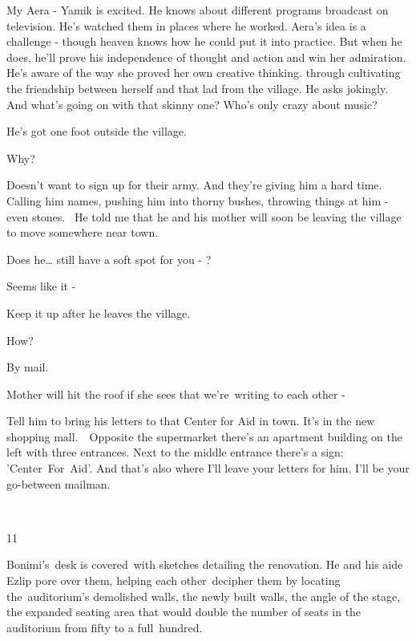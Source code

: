 \documentclass[twoside,11pt]{book}
\begin{document}
{\textquotedbl}My Aera -{\textquotedbl} Yamik is excited. He knows about different programs broadcast on television.
He's watched them in places where he worked. Aera's idea is a challenge - though heaven knows how he could put it into
practice. But when he does, he'll prove his independence of thought and action and win her admiration. He's aware of
the way she proved her own creative thinking{. }through cultivating the friendship between herself and
that lad from the village. He asks jokingly. {\textquotedbl}And what's going on with that skinny one? Who's only crazy
about music?{\textquotedbl} \ 

{\textquotedbl}He's got one foot outside the village.{\textquotedbl} 

{\textquotedbl}Why?{\textquotedbl}

{\textquotedbl}Doesn't want to sign up for their army. And they're giving him a hard time. Calling him names, pushing
him into thorny bushes, throwing things at him - even stones. ~He told me that he and his mother will soon be leaving
the village to move somewhere near town.{\textquotedbl} 

{\textquotedbl}Does he{\dots} still have a soft spot for you - ?{\textquotedbl}

{\textquotedbl}Seems like it -{\textquotedbl} 

{\textquotedbl}Keep it up after he leaves the village.{\textquotedbl} 

{\textquotedbl}How?{\textquotedbl} 

{\textquotedbl}By mail.{\textquotedbl} 

{\textquotedbl}Mother will hit the roof if she sees that we're\ writing to each other -{\textquotedbl} 

{\textquotedbl}Tell him to bring his letters to that Center for Aid in town. It's in the new shopping mall.\ \ Opposite
the supermarket there's an apartment building on the left with three entrances. Next to the middle entrance there's a
sign: 'Center\ For\ Aid'. And that's also where I'll leave your letters for him. I'll be your go-between
mailman.{\textquotedbl} 

~

11 

Bonimi's~desk is covered{\ }with sketches detailing the renovation. He and his aide Ezlip pore over them,
helping each other~decipher them by locating the~auditorium's demolished walls, the newly built walls, the angle of the
stage, the expanded seating area that would double the number of seats in the auditorium from fifty to a
full{\ }hundred.~ 
\end{document}
